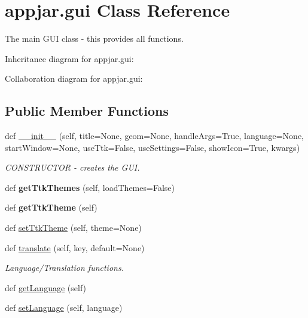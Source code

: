 \hypertarget{classappjar_1_1gui}{}\section{appjar.\+gui Class Reference}
\label{classappjar_1_1gui}


The main G\+UI class -\/ this provides all functions.  




Inheritance diagram for appjar.\+gui\+:


Collaboration diagram for appjar.\+gui\+:
\subsection*{Public Member Functions}
\begin{DoxyCompactItemize}
\item 
def \hyperlink{classappjar_1_1gui_aa3e4bc37b4a4d2a9a4c28b0c01f329df}{\+\_\+\+\_\+init\+\_\+\+\_\+} (self, title=None, geom=None, handle\+Args=True, language=None, start\+Window=None, use\+Ttk=False, use\+Settings=False, show\+Icon=True, kwargs)
\begin{DoxyCompactList}\small\item\em C\+O\+N\+S\+T\+R\+U\+C\+T\+OR -\/ creates the G\+UI. \end{DoxyCompactList}\item 
\mbox{\label{classappjar_1_1gui_a1e0c3ac83bba29e56dd9c8d9baa660f6}} 
def {\bfseries get\+Ttk\+Themes} (self, load\+Themes=False)
\item 
\mbox{\label{classappjar_1_1gui_af2fad4de9a5c740d798fe55e98cf6589}} 
def {\bfseries get\+Ttk\+Theme} (self)
\item 
def \hyperlink{classappjar_1_1gui_aa1291398af2b803f6b4b6efb2a738f93}{set\+Ttk\+Theme} (self, theme=None)
\item 
def \hyperlink{classappjar_1_1gui_a799b0aab5dbf6b53ab9c7ef1d197565d}{translate} (self, key, default=None)
\begin{DoxyCompactList}\small\item\em Language/\+Translation functions. \end{DoxyCompactList}\item 
def \hyperlink{classappjar_1_1gui_a456aad9d9af68d845d12657ef103e4f6}{get\+Language} (self)
\item 
def \hyperlink{classappjar_1_1gui_afc9105b4a07285fb71c5fb253a13ec80}{set\+Language} (self, language)

\end{DoxyCompactItemize}
